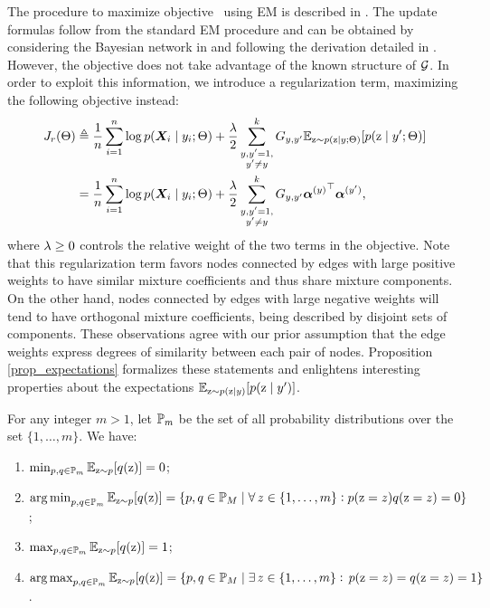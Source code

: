 The procedure to maximize objective~ using EM is described in . The update formulas follow from the standard EM procedure and can be obtained by considering the Bayesian network in  and following the derivation detailed in . However, the objective  does not take advantage of the known structure of ${\mathcal{G}}$. In order to exploit this information, we introduce a regularization term, maximizing the following objective instead:
\begin{align}
    \label{eq:spamhmm_objective}
    J_r(\Theta) &\triangleq \frac{1}{n}\sum_{i=1}^n \log p({\bm{X}}_i \mid y_i; \Theta) + \frac{\lambda}{2} \sum_{\substack{y,y'=1,\\y'\neq y}}^{k} {G}_{y,y'} \mathbb{E}_{{\textnormal{z}} \sim p({\textnormal{z}} \mid y; \Theta)} [ p({\textnormal{z}} \mid y'; \Theta) ] \nonumber\\
    &= \frac{1}{n}\sum_{i=1}^n \log p({\bm{X}}_i \mid y_i; \Theta) + \frac{\lambda}{2} \sum_{\substack{y,y'=1,\\y'\neq y}}^{k} {G}_{y,y'} {{\bm{\alpha}}^{(y)}}^\top {\bm{\alpha}}^{(y')},
\end{align}
where $\lambda \geq 0$ controls the relative weight of the two terms in the objective. Note that this regularization term favors nodes connected by edges with large positive weights to have similar mixture coefficients and thus share mixture components. On the other hand, nodes connected by edges with large negative weights will tend to have orthogonal mixture coefficients, being described by disjoint sets of components. These observations agree with our prior assumption that the edge weights express degrees of similarity between each pair of nodes. Proposition \ref{prop_expectations} formalizes these statements and enlightens interesting properties about the expectations $\mathbb{E}_{{\textnormal{z}} \sim p({\textnormal{z}} \mid y)} [ p({\textnormal{z}} \mid y')]$.
\begin{proposition}
    \label{prop_expectations}
    For any integer $m>1$, let ${\mathbb{P}}_m$ be the set of all probability distributions over the set $\{1,\dots,m\}$. We have:
    \begin{enumerate}
        \item $\min_{p,q \in {\mathbb{P}}_m} \mathbb{E}_{{\textnormal{z}}\sim p} [ q({\textnormal{z}}) ] = 0$; \label{prop_min}
        \item $\operatorname*{arg\,min}_{p,q \in {\mathbb{P}}_m} \mathbb{E}_{{\textnormal{z}}\sim p} [ q({\textnormal{z}}) ] = \{p,q \in {\mathbb{P}}_M \mid \forall \, z \in \{1,\dots,m\}: p({\textnormal{z}} = z)q({\textnormal{z}} = z)=0\}$; \label{prop_argmin}
        \item $\max_{p,q \in {\mathbb{P}}_m} \mathbb{E}_{{\textnormal{z}}\sim p} [ q({\textnormal{z}}) ] = 1$; \label{prop_max}
        \item $\operatorname*{arg\,max}_{p,q \in {\mathbb{P}}_m} \mathbb{E}_{{\textnormal{z}}\sim p} [ q({\textnormal{z}}) ] = \{p,q \in {\mathbb{P}}_M \mid \exists \, z \in \{1,\dots,m\} : \, p({\textnormal{z}} = z)=q({\textnormal{z}} = z)=1\}$ \label{prop_argmax}.
    \end{enumerate}
\end{proposition}
